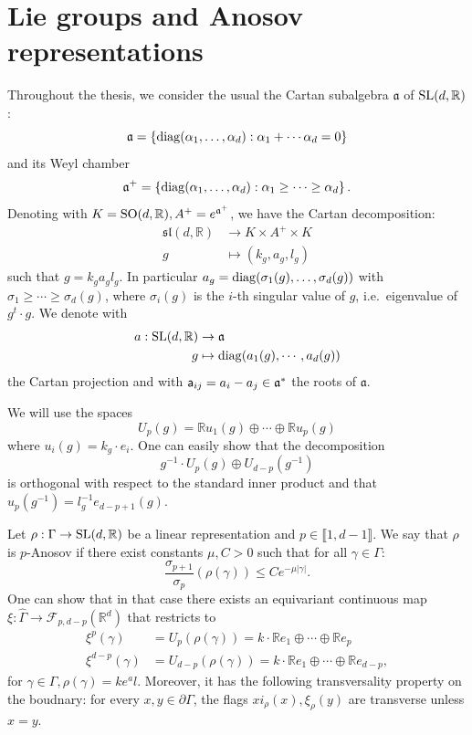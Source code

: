 \documentclass{report}
\begin{document}
\section{Lie groups and Anosov representations}
Throughout the thesis, we consider the usual the Cartan subalgebra $\mathfrak a$ of $\operatorname{{\mathrm{SL}}}(d,\mathbb R)$:
\[
    \mathfrak a = \left\{
        \operatorname{diag}(\alpha_1, \ldots, \alpha_d) : \alpha_1 + \cdots \alpha_d = 0
    \right\}
\]
and its Weyl chamber
\[
    \mathfrak a^+ = \left\{
        \operatorname{diag}(\alpha_1, \ldots, \alpha_d) : \alpha_1 \geq \cdots \geq \alpha_d
    \right\}.
\]
Denoting with $K = \operatorname{{\mathrm{SO}}}(d, \mathbb R), A^+ = e^{\mathfrak a^+} $, we have the Cartan decomposition:
\begin{align*}
    \mathfrak{sl}(d, \mathbb R) &\rightarrow K \times A^+ \times K\\
    g &\mapsto (k_g, a_g, l_g) 
\end{align*}
such that $g = k_g a_g l_g$.
In particular $a_g = \operatorname{diag}(\sigma_1(g), \ldots, \sigma_d(g))$ with $\sigma_1 \geq \cdots \geq \sigma_d(g)$,
where $\sigma_i(g)$ is the $i$-th singular value of $g$, i.e.\ eigenvalue of $g^t \cdot g$.
We denote with 
\begin{align*}
    a: \operatorname{{\mathrm{SL}}}(d, \mathbb R) &\to \mathfrak a\\
    g &\mapsto \operatorname{diag}(a_1(g), \cdots, a_d(g))
\end{align*}
the Cartan projection and with ${\sf a}_{ij} = a_i - a_j \in \mathfrak a^*$ the roots of $\mathfrak a$.

We will use the spaces
\[
    U_p(g) = \mathbb R u_1(g) \oplus \cdots \oplus \mathbb R u_p(g)   
\]
where $u_i(g) = k_g \cdot e_i$.
One can easily show that the decomposition
\[
    g^{-1} \cdot U_p(g) \oplus U_{d-p}(g^{-1})
\]
is orthogonal with respect to the standard inner product and that
$u_p(g^{-1}) = l_g^{-1} e_{d-p+1}(g).$
\begin{definition}
    Let $\rho: \Gamma \to \operatorname{{\mathrm{SL}}}(d, \mathbb R)$ be a linear representation and $p \in \llbracket 1, d-1 \rrbracket$.
    We say that $\rho$ is $p$-Anosov if there exist constants $\mu, C>0$ such that for all $\gamma \in \Gamma$:
    \[
        \frac{\sigma_{p+1}}{\sigma_p}(\rho(\gamma)) \leq C e^{-\mu |\gamma|}.
    \]
    One can show that in that case there exists an equivariant continuous map $\xi: \hat \Gamma \to \mathcal F_{p, d-p}(\mathbb R^d) $ that restricts to
    \begin{align*}
        \xi^p(\gamma) &= U_p(\rho(\gamma)) = k \cdot \mathbb R e_1 \oplus \cdots \oplus \mathbb R e_p\\
        \xi^{d-p}(\gamma) &= U_{d-p}(\rho(\gamma)) = k \cdot \mathbb R e_1 \oplus \cdots \oplus \mathbb R e_{d-p},
    \end{align*}
    for $\gamma \in \Gamma, \rho(\gamma) = k e^a l$.
    Moreover, it has the following transversality property on the boudnary: for every $x, y \in \partial \Gamma$, the flags $xi_\rho(x), \xi_\rho(y)$ are transverse unless $x=y$.
    \end{definition}    
\end{document}
